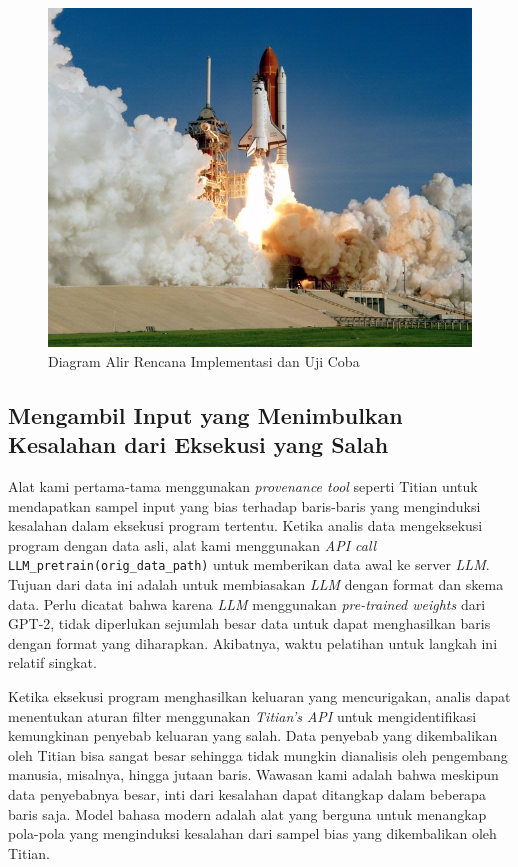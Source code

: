 \begin{figure}[H]
  \centering
  \includegraphics[scale=0.35]{gambar/roketluarangkasa.jpg}

  \caption{Diagram Alir Rencana Implementasi dan Uji Coba}
  \label{fig:diagram alir implementasi}
\end{figure}

\subsection{Mengambil Input yang Menimbulkan Kesalahan dari Eksekusi yang Salah}
\label{sec:mengambil input}

Alat kami pertama-tama menggunakan \emph{provenance tool} 
seperti Titian untuk mendapatkan sampel input yang bias 
terhadap baris-baris yang menginduksi kesalahan dalam eksekusi 
program tertentu. Ketika analis data mengeksekusi program 
dengan data asli, alat kami menggunakan \emph{API call} 
{\tt LLM\_pretrain(orig\_data\_path)} untuk memberikan data 
awal ke server \emph{LLM}. Tujuan dari data ini adalah untuk 
membiasakan \emph{LLM} dengan format dan skema data. 
Perlu dicatat bahwa karena \emph{LLM} menggunakan 
\emph{pre-trained weights} dari GPT-2, tidak diperlukan 
sejumlah besar data untuk dapat menghasilkan baris dengan 
format yang diharapkan. Akibatnya, waktu pelatihan untuk 
langkah ini relatif singkat.

Ketika eksekusi program menghasilkan keluaran yang 
mencurigakan, analis dapat menentukan aturan filter 
menggunakan \emph{Titian's API} untuk mengidentifikasi 
kemungkinan penyebab keluaran yang salah. Data penyebab 
yang dikembalikan oleh Titian bisa sangat besar sehingga 
tidak mungkin dianalisis oleh pengembang manusia, misalnya, 
hingga jutaan baris. Wawasan kami adalah bahwa meskipun data 
penyebabnya besar, inti dari kesalahan dapat ditangkap dalam 
beberapa baris saja. Model bahasa modern adalah alat yang 
berguna untuk menangkap pola-pola yang menginduksi kesalahan 
dari sampel bias yang dikembalikan oleh Titian.

